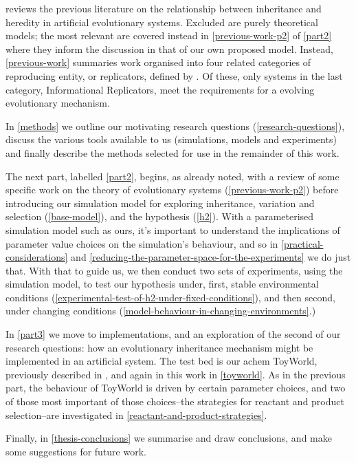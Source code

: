  reviews the previous literature on the relationship between inheritance and heredity in artificial evolutionary systems. Excluded are purely theoretical models; the most relevant are covered instead in \cref{previous-work-p2} of \cref{part2} where they inform the discussion in that  of our own proposed model. Instead, \cref{previous-work} summaries work organised into four related categories of reproducing entity, or replicators, defined by \textcite{Zachar2010}. Of these, only systems in the last category, Informational Replicators, meet the requirements for a evolving evolutionary mechanism.

In \cref{methods} we outline our motivating research questions (\cref{research-questions}), discuss the various tools available to us (simulations, models and experiments) and finally describe the methods selected for use in the remainder of this work.

The next part, labelled \cref{part2}, begins, as already noted, with a review of some specific work on the theory of evolutionary systems (\cref{previous-work-p2}) before introducing our simulation model for exploring inheritance, variation and selection (\cref{base-model}), and the hypothesis (\cref{h2}). With a parameterised simulation model such as ours, it's important to understand the implications of parameter value choices on the simulation's behaviour, and so in \cref{practical-considerations} and \cref{reducing-the-parameter-space-for-the-experiments} we do just that. With that to guide us, we then conduct two sets of experiments, using the simulation model, to test our hypothesis under, first, stable environmental conditions (\cref{experimental-test-of-h2-under-fixed-conditions}), and then second, under changing conditions (\cref{model-behaviour-in-changing-environments}.)

In \cref{part3} we move to implementations, and an exploration of the second of our research questions: how an evolutionary inheritance mechanism might be implemented in an artificial system. The test bed is our \gls{achem} ToyWorld, previously described in \textcite{Young2013, Young2015}, and again in this work in \cref{toyworld}. As in the previous part, the behaviour of ToyWorld is driven by certain parameter choices, and two of those most important of those choices--the strategies for reactant and product selection--are investigated in \cref{reactant-and-product-strategies}.

Finally, in \cref{thesis-conclusions} we summarise and draw conclusions, and make some suggestions for future work.

